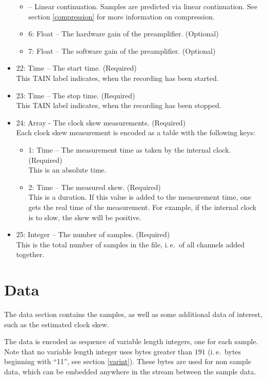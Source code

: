 \documentclass[DIV=10]{scrartcl}
\renewenvironment{quote}
{\list{}{
  \setlength{\rightmargin}{0cm}
  \setlength{\leftmargin}{0.75cm}}%
\item\relax\ignorespaces}
{\unskip\unskip\endlist}
\begin{document}
\begin{itemize}
\begin{itemize}
\begin{quote}
      2 – Linear continuation.
      Samples are predicted via linear continuation.
    \end{quote}
    See section \ref{compression} for more information on compression.
    \item 6: Float – The hardware gain of the preamplifier. (Optional)
    \item 7: Float – The software gain of the preamplifier. (Optional)
  \end{itemize}
  \item 22: Time – The start time. (Required)\\
  This TAIN label indicates, when the recording has been started.
  \item 23: Time – The stop time. (Required)\\
  This TAIN label indicates, when the recording has been stopped.
  \item 24: Array - The clock skew measurements. (Required)\\
  Each clock skew measurement is encoded as a table with the following keys:
  \begin{itemize}
    \item 1: Time – The measurement time as taken by the internal clock. (Required)\\
    This is an absolute time.
    \item 2: Time – The measured skew. (Required)\\
    This is a duration.
    If this value is added to the measurement time, one gets the real time of the measurement.
    For example, if the internal clock is to slow, the skew will be positive.
  \end{itemize}
  \item 25: Integer – The number of samples. (Required)\\
  This is the total number of samples in the file, i.\,e.\ of all channels added together.
\end{itemize}

\section{Data}

The data section contains the samples, as well as some additional data of interest, such as the estimated clock skew.

The data is encoded as sequence of variable length integers, one for each sample.
Note that no variable length integer uses bytes greater than \(191\) (i.\,e.\ bytes beginning with “11”, see section \ref{varint}).
These bytes are used for non sample data, which can be embedded anywhere in the stream between the sample data.
\end{document}
